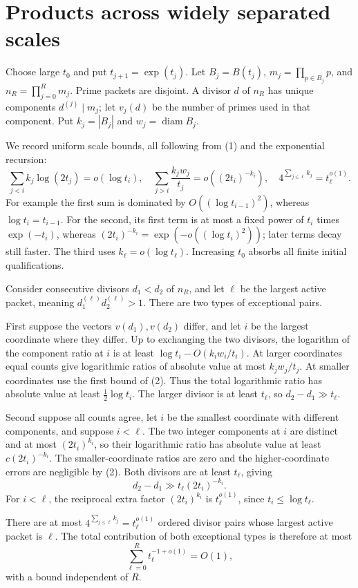 \documentclass[11pt]{article}
\begin{document}
\section*{Products across widely separated scales}
Choose large $t_0$ and put $t_{j+1}=\exp(t_j)$. Let $B_j=B(t_j)$, $m_j=\prod_{p\in B_j}p$, and $n_R=\prod_{j=0}^R m_j$. Prime packets are disjoint. A divisor $d$ of $n_R$ has unique components $d^{(j)}\mid m_j$; let $v_j(d)$ be the number of primes used in that component. Put $k_j=|B_j|$ and $w_j=\operatorname{diam}B_j$.

We record uniform scale bounds, all following from (1) and the exponential recursion:
\[
 \sum_{j< i}k_j\log(2t_j)=o(\log t_i),\quad
 \sum_{j>i}\frac{k_jw_j}{t_j}=o((2t_i)^{-k_i}),\quad
 4^{\sum_{j\le\ell}k_j}=t_\ell^{o(1)}.\tag{2}
\]
For example the first sum is dominated by $O((\log t_{i-1})^2)$, whereas $\log t_i=t_{i-1}$. For the second, its first term is at most a fixed power of $t_i$ times $\exp(-t_i)$, whereas $(2t_i)^{-k_i}=\exp(-o((\log t_i)^2))$; later terms decay still faster. The third uses $k_\ell=o(\log t_\ell)$. Increasing $t_0$ absorbs all finite initial qualifications.

Consider consecutive divisors $d_1<d_2$ of $n_R$, and let $\ell$ be the largest active packet, meaning $d_1^{(\ell)}d_2^{(\ell)}>1$. There are two types of exceptional pairs.

First suppose the vectors $v(d_1),v(d_2)$ differ, and let $i$ be the largest coordinate where they differ. Up to exchanging the two divisors, the logarithm of the component ratio at $i$ is at least $\log t_i-O(k_iw_i/t_i)$. At larger coordinates equal counts give logarithmic ratios of absolute value at most $k_jw_j/t_j$. At smaller coordinates use the first bound of (2). Thus the total logarithmic ratio has absolute value at least $\frac12\log t_i$. The larger divisor is at least $t_\ell$, so $d_2-d_1\gg t_\ell$.

Second suppose all counts agree, let $i$ be the smallest coordinate with different components, and suppose $i<\ell$. The two integer components at $i$ are distinct and at most $(2t_i)^{k_i}$, so their logarithmic ratio has absolute value at least $c(2t_i)^{-k_i}$. The smaller-coordinate ratios are zero and the higher-coordinate errors are negligible by (2). Both divisors are at least $t_\ell$, giving
\[
 d_2-d_1\gg t_\ell(2t_i)^{-k_i}.
\]
For $i<\ell$, the reciprocal extra factor $(2t_i)^{k_i}$ is $t_\ell^{o(1)}$, since $t_i\le\log t_\ell$.

There are at most $4^{\sum_{j\le\ell}k_j}=t_\ell^{o(1)}$ ordered divisor pairs whose largest active packet is $\ell$. The total contribution of both exceptional types is therefore at most
\[
 \sum_{\ell=0}^R t_\ell^{-1+o(1)}=O(1),\tag{3}
\]
with a bound independent of $R$.
\end{document}
